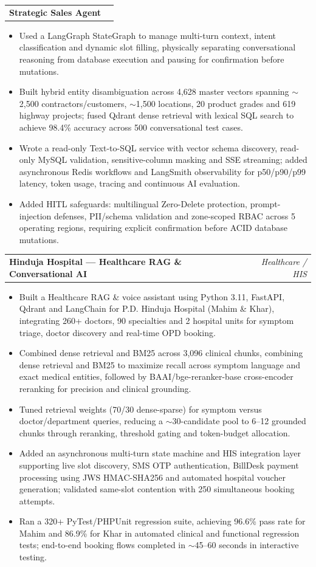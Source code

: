 \documentclass[10pt,a4paper]{article}
\makeatletter
\newcommand{\resumeRole}[2]{
  \begin{tabularx}{\textwidth}{@{}X r@{}}
    \textbf{#1} & \textit{#2}
  \end{tabularx}
  \vspace{-2pt}
}
\makeatother
\begin{document}
\resumeRole{Strategic Sales Agent}{}
\begin{itemize}
  \item Used a LangGraph StateGraph to manage multi-turn context, intent classification and dynamic slot filling, physically separating conversational reasoning from database execution and pausing for confirmation before mutations.
  \item Built hybrid entity disambiguation across 4,628 master vectors spanning $\sim$2,500 contractors/customers, $\sim$1,500 locations, 20 product grades and 619 highway projects; fused Qdrant dense retrieval with lexical SQL search to achieve 98.4\% accuracy across 500 conversational test cases.
  \item Wrote a read-only Text-to-SQL service with vector schema discovery, read-only MySQL validation, sensitive-column masking and SSE streaming; added asynchronous Redis workflows and LangSmith observability for p50/p90/p99 latency, token usage, tracing and continuous AI evaluation.
  \item Added HITL safeguards: multilingual Zero-Delete protection, prompt-injection defenses, PII/schema validation and zone-scoped RBAC across 5 operating regions, requiring explicit confirmation before ACID database mutations.
\end{itemize}

\resumeRole{Hinduja Hospital --- Healthcare RAG \& Conversational AI}{Healthcare / HIS}
\begin{itemize}
  \item Built a Healthcare RAG \& voice assistant using Python 3.11, FastAPI, Qdrant and LangChain for P.D. Hinduja Hospital (Mahim \& Khar), integrating 260+ doctors, 90 specialties and 2 hospital units for symptom triage, doctor discovery and real-time OPD booking.
  \item Combined dense retrieval and BM25 across 3,096 clinical chunks, combining dense retrieval and BM25 to maximize recall across symptom language and exact medical entities, followed by BAAI/bge-reranker-base cross-encoder reranking for precision and clinical grounding.
  \item Tuned retrieval weights (70/30 dense-sparse) for symptom versus doctor/department queries, reducing a $\sim$30-candidate pool to 6--12 grounded chunks through reranking, threshold gating and token-budget allocation.
  \item Added an asynchronous multi-turn state machine and HIS integration layer supporting live slot discovery, SMS OTP authentication, BillDesk payment processing using JWS HMAC-SHA256 and automated hospital voucher generation; validated same-slot contention with 250 simultaneous booking attempts.
  \item Ran a 320+ PyTest/PHPUnit regression suite, achieving 96.6\% pass rate for Mahim and 86.9\% for Khar in automated clinical and functional regression tests; end-to-end booking flows completed in $\sim$45--60 seconds in interactive testing.
\end{itemize}
\end{document}
